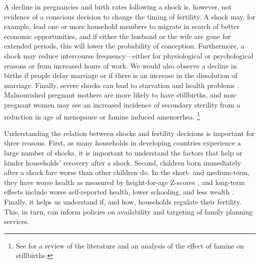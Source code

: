 \documentclass[letterpaper,12pt]{article}
\begin{document}
A decline in pregnancies and birth rates following a shock is, however, 
not evidence of a conscious decision to change the timing of fertility.
A shock may, for example, lead one or more household members to 
migrate in search of better economic opportunities, and if either the husband 
or the wife are gone for extended periods, this will lower the probability of 
conception.
Furthermore, a shock may reduce intercourse frequency---either for
physiological or psychological reasons or from increased hours of work.
We would also observe a decline in births if people delay marriage or 
if there is an increase in the dissolution of marriage.
Finally, severe shocks can lead to starvation and health problems \citep{lindstrom99}.
Malnourished pregnant mothers are more likely to have stillbirths,
and non-pregnant women may see an increased incidence of secondary sterility
from a reduction in age of menopause or famine induced amenorrhea.%
\footnote{
See \cite{Hernandez-Julian2014} for a review of the literature and an 
analysis of the effect of famine on stillbirths.
}

Understanding the relation between shocks and fertility decisions is important for
three reasons.
First, as many households in developing countries experience a large number of shocks, 
it is important to understand the factors that help or hinder households' recovery 
after a shock.
Second, children born immediately after a shock fare worse than other children do.
In the short- and medium-term, they have worse health as measured by height-for-age 
Z-scores \citep{Portner2010}, and
long-term effects include worse self-reported health, lower schooling, and less
wealth \citep{Maccini2009}.
Finally, it helps us understand if, and how, households regulate their fertility.
This, in turn, can inform policies on availability and targeting
of family planning services.
\end{document}
